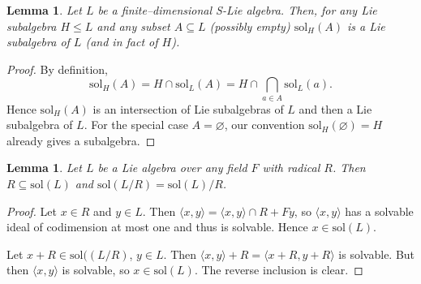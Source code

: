 \documentclass[11pt]{amsart}
\theoremstyle{plain}
\newtheorem{lemma}[theorem]{Lemma}
\def\sol{\mathrm{sol}}
\begin{document}


\begin{lemma}\label{Lie-2.10}
Let $L$ be a finite–dimensional S-Lie algebra. Then, for any Lie subalgebra $H\leq L$ and any subset $A\subseteq L$ (possibly empty) $\sol_{H}(A)$ is a Lie subalgebra of $L$ (and in fact of $H$).
\end{lemma}

\begin{proof}
By definition,
\[\sol_H(A) = H\cap \sol_L(A) = H\cap \bigcap_{a\in A} \sol_L(a).\]
Hence $\sol_{H}(A)$ is an intersection of Lie subalgebras of $L$ and then a Lie subalgebra of $L$. For the special case $A=\varnothing$, our convention $\sol_{H}(\varnothing)=H$ already gives a subalgebra.
\end{proof}






\begin{lemma}\label{rad} 
Let $L$ be a Lie algebra over any field $F$ with radical $R$. Then $R\subseteq \sol(L)$ and $\sol(L/R) = \sol(L)/R$.
\end{lemma}

\begin{proof} 
Let $x\in R$ and $y\in L$. Then $\langle x,y\rangle = \langle x,y\rangle\cap R+Fy$, so $\langle x,y\rangle$ has a solvable ideal of codimension at most one and thus is solvable. Hence $x\in \sol(L)$.
\par

Let $x+R\in \sol((L/R)$, $y\in L$. Then $\langle x,y\rangle+R=\langle x+R,y+R\rangle$ is solvable. But then $\langle x,y\rangle$ is solvable, so $x\in \sol(L)$. The reverse inclusion is clear.
\end{proof}
\end{document}
